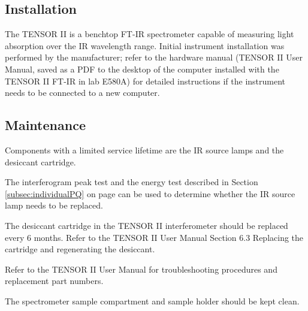 \subsection{Installation}
The TENSOR II is a benchtop FT-IR spectrometer capable of measuring light absorption over the IR wavelength range. Initial instrument installation was performed by the manufacturer; refer to the hardware manual (TENSOR II User Manual, saved as a PDF to the desktop of the computer installed with the TENSOR II FT-IR in lab E580A) for detailed instructions if the instrument needs to be connected to a new computer.

\subsection{Maintenance}
Components with a limited service lifetime are the IR source lamps and the desiccant cartridge.

The interferogram peak test and the energy test described in Section \ref{subsec:individualPQ} on page \pageref{subsec:individualPQ} can be used to determine whether the IR source lamp needs to be replaced.

The desiccant cartridge in the TENSOR II interferometer should be replaced every 6 months\cite{Bruker1}. Refer to the TENSOR II User Manual Section 6.3 Replacing the cartridge and regenerating the desiccant.

Refer to the TENSOR II User Manual for troubleshooting procedures and replacement part numbers.

The spectrometer sample compartment and sample holder should be kept clean. %



